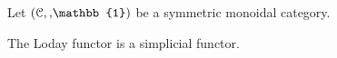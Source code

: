   \begin{defn}\label{def_loday_functor_in_symmetric_monoidal_category}
    Let $(\mathcal{C},\smash, \mathbb{1})$ be a symmetric monoidal category.\\
  \end{defn}

  \begin{lem}\label{lem_loday_functor_is_simplicial}
    The Loday functor is a simplicial functor.\\

  \end{lem}
